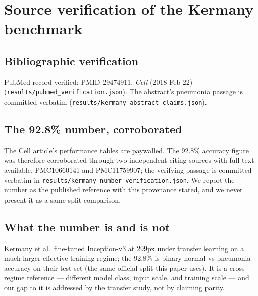 
\section{Source verification of the Kermany benchmark}
\subsection{Bibliographic verification}
PubMed record verified: PMID 29474911,
\emph{Cell} (2018 Feb 22)
(\texttt{results/pubmed\_verification.json}). The abstract's pneumonia
passage is committed verbatim (\texttt{results/kermany\_abstract\_claims.json}).
\subsection{The 92.8\% number, corroborated}
The Cell article's performance tables are paywalled. The 92.8\% accuracy
figure was therefore corroborated through two independent citing sources
with full text available, PMC10660141 and PMC11759907; the
verifying passage is committed verbatim in
\texttt{results/kermany\_number\_verification.json}. We report the number
as the published reference with this provenance stated, and we never
present it as a same-split comparison.
\subsection{What the number is and is not}
Kermany et al.\ fine-tuned Inception-v3 at 299px under transfer learning
on a much larger effective training regime; the 92.8\% is binary
normal-vs-pneumonia accuracy on their test set (the same official split
this paper uses). It is a cross-regime reference --- different model
class, input scale, and training scale --- and our gap to it is addressed
by the transfer study, not by claiming parity.
